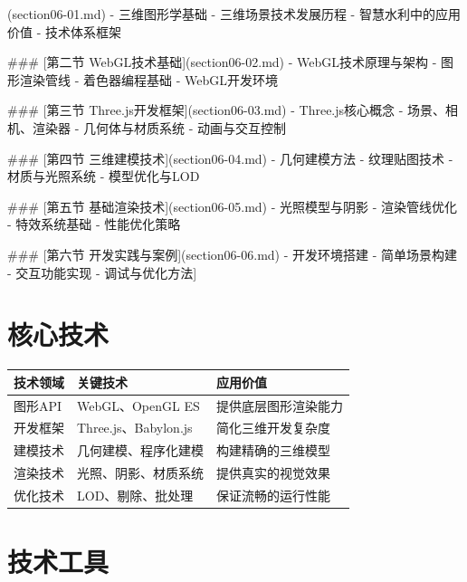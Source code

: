\begin{tcolorbox}[colback=cyan!5!white,colframe=cyan!75!black,title=Info 章节结构
    
    \##\# [第一节 三维场景技术概述](section06-01.md)
    - 三维图形学基础
    - 三维场景技术发展历程
    - 智慧水利中的应用价值
    - 技术体系框架
    
    \##\# [第二节 WebGL技术基础](section06-02.md) 
    - WebGL技术原理与架构
    - 图形渲染管线
    - 着色器编程基础
    - WebGL开发环境
    
    \##\# [第三节 Three.js开发框架](section06-03.md)
    - Three.js核心概念
    - 场景、相机、渲染器
    - 几何体与材质系统
    - 动画与交互控制
    
    \##\# [第四节 三维建模技术](section06-04.md)
    - 几何建模方法
    - 纹理贴图技术
    - 材质与光照系统
    - 模型优化与LOD
    
    \##\# [第五节 基础渲染技术](section06-05.md)
    - 光照模型与阴影
    - 渲染管线优化
    - 特效系统基础
    - 性能优化策略
    
    \##\# [第六节 开发实践与案例](section06-06.md)
    - 开发环境搭建
    - 简单场景构建
    - 交互功能实现
    - 调试与优化方法]
\section{核心技术}

\end{tcolorbox}

\begin{longtable}[]{@{}lll@{}}
\toprule\noalign{}
技术领域 & 关键技术 & 应用价值 \\
\midrule\noalign{}
\endhead
\bottomrule\noalign{}
\endlastfoot
图形API & WebGL、OpenGL ES & 提供底层图形渲染能力 \\
开发框架 & Three.js、Babylon.js & 简化三维开发复杂度 \\
建模技术 & 几何建模、程序化建模 & 构建精确的三维模型 \\
渲染技术 & 光照、阴影、材质系统 & 提供真实的视觉效果 \\
优化技术 & LOD、剔除、批处理 & 保证流畅的运行性能 \\
\end{longtable}

\section{技术工具}

